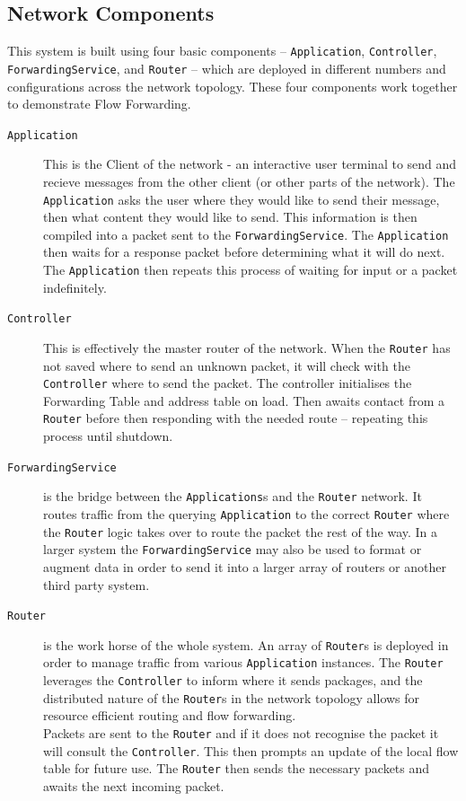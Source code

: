 \documentclass{article}
\newcommand{\code}[1]{\colorbox{light-gray}{\texttt{#1}}}
\begin{document}
    \subsection{Network Components}
    \label{subsec:communication}
    This system is built using four basic components -- \code{Application}, \code{Controller}, \code{ForwardingService}, and \code{Router} -- which are deployed in different numbers and configurations across the network topology. These four components work together to demonstrate Flow Forwarding.
    \begin{description}
        \item[\code{Application}] This is the Client of the network - an interactive user terminal to send and recieve messages from the other client (or other parts of the network). The \code{Application} asks the user where they would like to send their message, then what content they would like to send. This information is then compiled into a packet sent to the \code{ForwardingService}. The \code{Application} then waits for a response packet before determining what it will do next. The \code{Application} then repeats this process of waiting for input or a packet indefinitely.
        \item[\code{Controller}] This is effectively the master router of the network. When the \code{Router} has not saved where to send an unknown packet, it will check with the \code{Controller} where to send the packet. The controller initialises the Forwarding Table and address table on load. Then awaits contact from a \code{Router} before then responding with the needed route -- repeating this process until shutdown.
        \item[\code{ForwardingService}] is the bridge between the \code{Applications}s and the \code{Router} network. It routes traffic from the querying \code{Application} to the correct \code{Router} where the \code{Router} logic takes over to route the packet the rest of the way. In a larger system the \code{ForwardingService} may also be used to format or augment data in order to send it into a larger array of routers or another third party system.
        \item[\code{Router}] is the work horse of the whole system. An array of \code{Router}s is deployed in order to manage traffic from various \code{Application} instances. The \code{Router} leverages the \code{Controller} to inform where it sends packages, and the distributed nature of the \code{Router}s in the network topology allows for resource efficient routing and flow forwarding.\\
        Packets are sent to the \code{Router} and if it does not recognise the packet it will consult the \code{Controller}. This then prompts an update of the local flow table for future use. The \code{Router} then sends the necessary packets and awaits the next incoming packet.
    \end{description}
    
\end{document}
